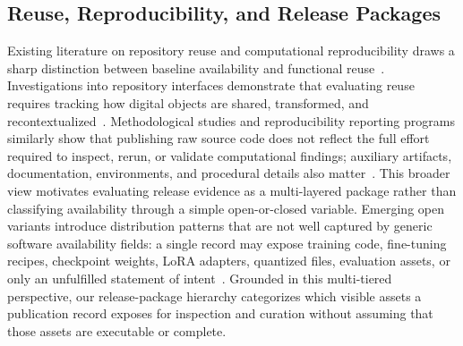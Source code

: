\subsection{Reuse, Reproducibility, and Release Packages}
Existing literature on repository reuse and computational reproducibility draws a sharp distinction between baseline availability and functional reuse~\cite{shiri2023reuse,stodden2014implementing,akella2023effort,dodge2019show,pineau2021reproducibility}.
Investigations into repository interfaces demonstrate that evaluating reuse requires tracking how digital objects are shared, transformed, and recontextualized~\cite{shiri2023reuse}.
Methodological studies and reproducibility reporting programs similarly show that publishing raw source code does not reflect the full effort required to inspect, rerun, or validate computational findings; auxiliary artifacts, documentation, environments, and procedural details also matter~\cite{stodden2014implementing,akella2023effort,dodge2019show,pineau2021reproducibility}.
This broader view motivates evaluating release evidence as a multi-layered package rather than classifying availability through a simple open-or-closed variable.
Emerging open \llm variants introduce distribution patterns that are not well captured by generic software availability fields: a single record may expose training code, fine-tuning recipes, checkpoint weights, LoRA adapters, quantized files, evaluation assets, or only an unfulfilled statement of intent~\cite{jiang2023ptmreuse,taraghi2024modelreuse,white2024mof}.
Grounded in this multi-tiered perspective, our release-package hierarchy categorizes which visible assets a publication record exposes for inspection and curation without assuming that those assets are executable or complete.

